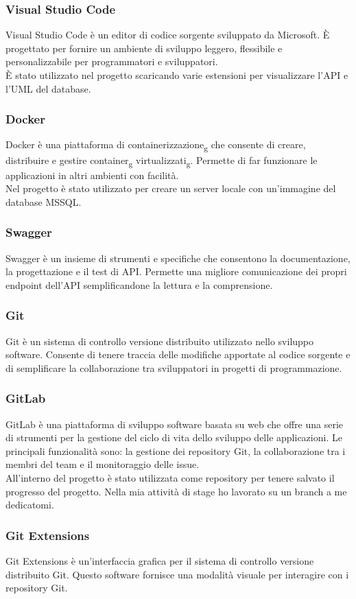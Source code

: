 \subsubsection*{Visual Studio Code}
Visual Studio Code è un editor di codice sorgente sviluppato da Microsoft. È progettato per fornire un ambiente di sviluppo leggero, flessibile e personalizzabile per programmatori e sviluppatori.\\
È stato utilizzato nel progetto scaricando varie estensioni per visualizzare l'API e l'UML del database.\\

\subsubsection*{Docker}
Docker è una piattaforma di containerizzazione\textsubscript{g} che consente di creare, distribuire e gestire container\textsubscript{g} virtualizzati\textsubscript{g}. Permette di far funzionare le applicazioni in altri ambienti con facilità.\\
Nel progetto è stato utilizzato per creare un server locale con un'immagine del database MSSQL.\\

\subsubsection*{Swagger}
Swagger è un insieme di strumenti e specifiche che consentono la documentazione, la progettazione e il test di API. Permette una migliore comunicazione dei propri endpoint dell'API semplificandone la lettura e la comprensione.\\

\subsubsection*{Git}
Git è un sistema di controllo versione distribuito utilizzato nello sviluppo software. Consente di tenere traccia delle modifiche apportate al codice sorgente e di semplificare la collaborazione tra sviluppatori in progetti di programmazione.\\


\subsubsection*{GitLab}
GitLab è una piattaforma di sviluppo software basata su web che offre una serie di strumenti per la gestione del ciclo di vita dello sviluppo delle applicazioni. Le principali funzionalità sono: la gestione dei repository Git, la collaborazione tra i membri del team e il monitoraggio delle issue.\\
All'interno del progetto è stato utilizzata come repository per tenere salvato il progresso del progetto. Nella mia attività di stage ho lavorato su un branch a me dedicatomi.\\

\subsubsection*{Git Extensions}
Git Extensions è un'interfaccia grafica per il sistema di controllo versione distribuito Git. Questo software fornisce una modalità visuale per interagire con i repository Git.




